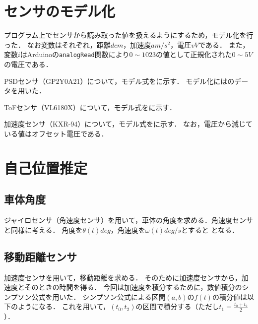 \documentclass[11pt,a4]{jsarticle}
\begin{document}

\section{センサのモデル化}
  プログラム上でセンサから読み取った値を扱えるようにするため，モデル化を行った．
  なお変数はそれぞれ，距離$d\unit{cm}$，加速度$a\unit{m/s^2}$，電圧$v\unit{V}$である．
  また，変数$i$はArduinoの\texttt{analogRead}関数により$0\sim1023$の値として正規化された$0\sim5\unit{V}$の電圧である．

  PSDセンサ（GP2Y0A21）について，モデル式をに示す．
  モデル化にはのデータを用いた．

  ToFセンサ（VL6180X）について，モデル式をに示す．

  加速度センサ（KXR-94）について，モデル式をに示す．
  なお，電圧から減じている値はオフセット電圧である．

\section{自己位置推定}  %

  \subsection{車体角度}
    ジャイロセンサ（角速度センサ）を用いて，車体の角度を求める．角速度センサと同様に考える．
    角度を$\theta(t)\unit{deg}$，角速度を$\omega(t)\unit{deg/s}$とすると
    となる．

  \subsection{移動距離センサ}
    加速度センサを用いて，移動距離を求める．
    そのために加速度センサから，加速度とそのときの時間を得る．
    今回は加速度を積分するために，数値積分のシンプソン公式を用いた．
    シンプソン公式による区間$(a,b)$の$f(t)$の積分値は以下のようになる．
    これを用いて，$(t_0,t_2)$の区間で積分する（ただし$t_1=\frac{t_0+t_2}{2}$）．
\end{document}
